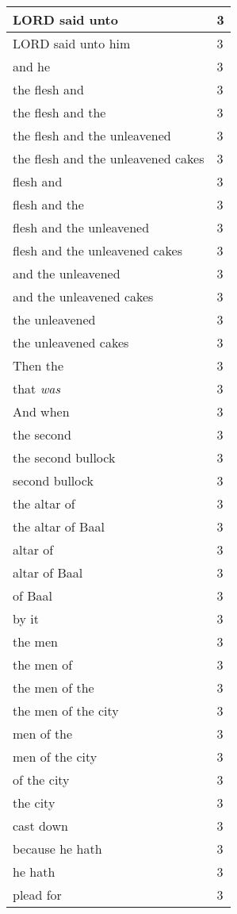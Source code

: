 \begin{center}
\begin{longtable}{|p{3.0in}|p{0.5in}|}
LORD said unto & 3\\ \hline 
LORD said unto him & 3\\ \hline 
and he & 3\\ \hline 
the flesh and & 3\\ \hline 
the flesh and the & 3\\ \hline 
the flesh and the unleavened & 3\\ \hline 
the flesh and the unleavened cakes & 3\\ \hline 
flesh and & 3\\ \hline 
flesh and the & 3\\ \hline 
flesh and the unleavened & 3\\ \hline 
flesh and the unleavened cakes & 3\\ \hline 
and the unleavened & 3\\ \hline 
and the unleavened cakes & 3\\ \hline 
the unleavened & 3\\ \hline 
the unleavened cakes & 3\\ \hline 
Then the & 3\\ \hline 
that \emph{was} & 3\\ \hline 
And when & 3\\ \hline 
the second & 3\\ \hline 
the second bullock & 3\\ \hline 
second bullock & 3\\ \hline 
the altar of & 3\\ \hline 
the altar of Baal & 3\\ \hline 
altar of & 3\\ \hline 
altar of Baal & 3\\ \hline 
of Baal & 3\\ \hline 
by it & 3\\ \hline 
the men & 3\\ \hline 
the men of & 3\\ \hline 
the men of the & 3\\ \hline 
the men of the city & 3\\ \hline 
men of the & 3\\ \hline 
men of the city & 3\\ \hline 
of the city & 3\\ \hline 
the city & 3\\ \hline 
cast down & 3\\ \hline 
because he hath & 3\\ \hline 
he hath & 3\\ \hline 
plead for & 3\\ \hline 
\end{longtable}
\end{center}





